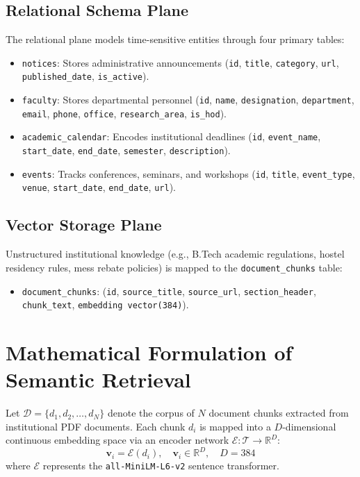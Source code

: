 \documentclass[12pt,a4paper]{report}
\begin{document}
\subsection{Relational Schema Plane}
The relational plane models time-sensitive entities through four primary tables:
\begin{itemize}
    \item \texttt{notices}: Stores administrative announcements (\texttt{id}, \texttt{title}, \texttt{category}, \texttt{url}, \texttt{published\_date}, \texttt{is\_active}).
    \item \texttt{faculty}: Stores departmental personnel (\texttt{id}, \texttt{name}, \texttt{designation}, \texttt{department}, \texttt{email}, \texttt{phone}, \texttt{office}, \texttt{research\_area}, \texttt{is\_hod}).
    \item \texttt{academic\_calendar}: Encodes institutional deadlines (\texttt{id}, \texttt{event\_name}, \texttt{start\_date}, \texttt{end\_date}, \texttt{semester}, \texttt{description}).
    \item \texttt{events}: Tracks conferences, seminars, and workshops (\texttt{id}, \texttt{title}, \texttt{event\_type}, \texttt{venue}, \texttt{start\_date}, \texttt{end\_date}, \texttt{url}).
\end{itemize}

\subsection{Vector Storage Plane}
Unstructured institutional knowledge (e.g., B.Tech academic regulations, hostel residency rules, mess rebate policies) is mapped to the \texttt{document\_chunks} table:
\begin{itemize}
    \item \texttt{document\_chunks}: (\texttt{id}, \texttt{source\_title}, \texttt{source\_url}, \texttt{section\_header}, \texttt{chunk\_text}, \texttt{embedding vector(384)}).
\end{itemize}

\section{Mathematical Formulation of Semantic Retrieval}
Let $\mathcal{D} = \{d_1, d_2, \dots, d_N\}$ denote the corpus of $N$ document chunks extracted from institutional PDF documents. Each chunk $d_i$ is mapped into a $D$-dimensional continuous embedding space via an encoder network $\mathcal{E}: \mathcal{T} \to \mathbb{R}^D$:
\begin{equation}
\mathbf{v}_i = \mathcal{E}(d_i), \quad \mathbf{v}_i \in \mathbb{R}^D, \quad D = 384
\end{equation}
where $\mathcal{E}$ represents the \texttt{all-MiniLM-L6-v2} sentence transformer.
\end{document}
